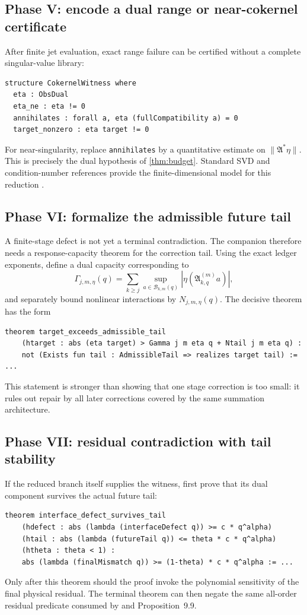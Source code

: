 \documentclass[12pt]{article}
\theoremstyle{plain}
\theoremstyle{definition}
\theoremstyle{remark}
\newcommand{\Comp}{\mathfrak A}
\newcommand{\Budget}{\mathcal B}
\begin{document}
\subsection{Phase V: encode a dual range or near-cokernel certificate}
After finite jet evaluation, exact range failure can be certified without a complete singular-value library:
\begin{lstlisting}
structure CokernelWitness where
  eta : ObsDual
  eta_ne : eta != 0
  annihilates : forall a, eta (fullCompatibility a) = 0
  target_nonzero : eta target != 0
\end{lstlisting}
For near-singularity, replace \texttt{annihilates} by a quantitative estimate on \(\|\Comp^*\eta\|\). This is precisely the dual hypothesis of \cref{thm:budget}. Standard SVD and condition-number references provide the finite-dimensional model for this reduction \cite{TrefethenBau1997,GolubVanLoan2013}.

\subsection{Phase VI: formalize the admissible future tail}
A finite-stage defect is not yet a terminal contradiction. The companion therefore needs a response-capacity theorem for the correction tail. Using the exact ledger exponents, define a dual capacity corresponding to
\[
\Gamma_{j,m,\eta}(q)
=\sum_{k\ge j}\sup_{a\in\Budget_{k,m}(q)}
|\eta(\Comp_{k,q}^{(m)}a)|,
\]
and separately bound nonlinear interactions by \(N_{j,m,\eta}(q)\). The decisive theorem has the form
\begin{lstlisting}
theorem target_exceeds_admissible_tail
    (htarget : abs (eta target) > Gamma j m eta q + Ntail j m eta q) :
    not (Exists fun tail : AdmissibleTail => realizes target tail) := ...
\end{lstlisting}
This statement is stronger than showing that one stage correction is too small: it rules out repair by all later corrections covered by the same summation architecture.

\subsection{Phase VII: residual contradiction with tail stability}
If the reduced branch itself supplies the witness, first prove that its dual component survives the actual future tail:
\begin{lstlisting}
theorem interface_defect_survives_tail
    (hdefect : abs (lambda (interfaceDefect q)) >= c * q^alpha)
    (htail : abs (lambda (futureTail q)) <= theta * c * q^alpha)
    (htheta : theta < 1) :
    abs (lambda (finalMismatch q)) >= (1-theta) * c * q^alpha := ...
\end{lstlisting}
Only after this theorem should the proof invoke the polynomial sensitivity of the final physical residual. The terminal theorem can then negate the same all-order residual predicate consumed by  and Proposition~9.9.
\end{document}
